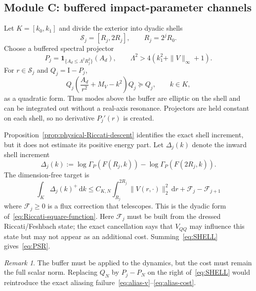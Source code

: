 \documentclass[11pt]{article}
\newcommand{\Id}{\mathrm I}
\newcommand{\dd}{\,\mathrm d}
\theoremstyle{definition}
\theoremstyle{remark}
\newtheorem{remark}[theorem]{Remark}
\begin{document}
\subsection{Module C: buffered impact-parameter channels}

Let $K=[k_0,k_1]$ and divide the exterior into dyadic shells
\begin{equation}
 \mathcal S_j=[R_j,2R_j],
 \qquad R_j=2^jR_0.
 \label{eq:shells}
\end{equation}
Choose a buffered spectral projector
\begin{equation}
 P_j=\mathbf1_{\{A_d\leq \Lambda^2R_j^2\}}(A_d),
 \qquad
 \Lambda^2>4(k_1^2+\|V\|_\infty+1).
 \label{eq:moving-proj}
\end{equation}
For $r\in\mathcal S_j$ and $Q_j=\Id-P_j$,
\begin{equation}
 Q_j\left(\frac{A_d}{r^2}+M_V-k^2\right)Q_j
 \succeq Q_j,
 \qquad k\in K,
 \label{eq:elliptic-high}
\end{equation}
as a quadratic form.  Thus modes above the buffer are elliptic on the shell and can be integrated out without a real-axis resonance.  Projectors are held constant on each shell, so no derivative $P_j'(r)$ is created.

Proposition~\ref{prop:physical-Riccati-descent} identifies the exact shell
increment, but it does not estimate its positive energy part.  Let
$\Delta_j(k)$ denote the inward shell increment
\begin{equation}
 \Delta_j(k)
 :=\log\Gamma_P(F(R_j,k))-\log\Gamma_P(F(2R_j,k)).
 \label{eq:oriented-shell-increment}
\end{equation}
The dimension-free target is
\begin{equation}
 \int_K\Delta_j(k)^+\dd k
 \leq C_{K,N}\int_{R_j}^{2R_j}\|V(r,\cdot)\|_2^2\dd r
 +\mathcal F_j-\mathcal F_{j+1}
 \label{eq:SHELL}
\end{equation}
where $\mathcal F_j\geq0$ is a flux correction that telescopes.  This is the
dyadic form of~\eqref{eq:Riccati-square-function}.  Here $\mathcal F_j$ must be
built from the dressed Riccati/Feshbach state; the exact cancellation says that
$V_{QQ}$ may influence this state but may not appear as an additional cost.
Summing~\eqref{eq:SHELL} gives~\eqref{eq:PSR}.

\begin{remark}
The buffer must be applied to the dynamics, but the cost must remain the full scalar norm.  Replacing $Q_N$ by $P_j-P_N$ on the right of~\eqref{eq:SHELL} would reintroduce the exact aliasing failure~\eqref{eq:alias-v}--\eqref{eq:alias-cost}.
\end{remark}
\end{document}
